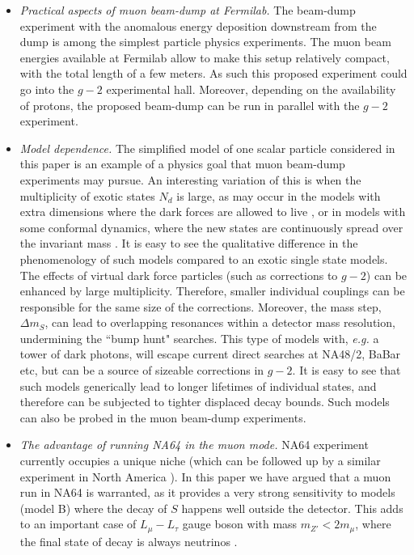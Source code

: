 \documentclass[prd,onecolumn,notitlepage,
nofootinbib,aps,tightenlines,
preprintnumbers,amsmath,amssymb,amsfonts,showpacs,superscriptaddress]{revtex4-1}
\begin{document}
\begin{itemize}

\item {\em Practical aspects of muon beam-dump at Fermilab.} The beam-dump experiment with the anomalous energy 
deposition downstream from the dump is among the simplest particle physics experiments. The muon beam energies
available at Fermilab allow to make this setup relatively compact, with the total length of a few meters. As such 
this proposed experiment could go into the $g-2$ experimental hall. Moreover, depending on the availability of protons, 
the proposed beam-dump can be run in parallel with the $g-2$ experiment. 

\item {\em Model dependence. } The simplified model of one scalar particle considered in this paper is an example of a 
physics goal that muon beam-dump experiments may pursue. An interesting variation of this is when the 
multiplicity of exotic states $N_d$ is large, as 
may occur in the models with extra dimensions where the dark forces 
are allowed to live \cite{McDonald:2010iq,Wallace:2013eya,Jaeckel:2014eba}, 
or in models with some conformal  dynamics, where the new states are continuously spread over the invariant mass \cite{Georgi:2007ek}. 
It is easy to see the qualitative difference in the phenomenology of such models compared to an exotic single state models. 
The effects of virtual dark force particles (such as corrections 
to $g-2$) can be enhanced by large multiplicity. 
Therefore, smaller individual couplings can be responsible for the same size of the corrections. Moreover, the 
mass step, $\Delta m_S$, can lead to overlapping resonances within a detector mass resolution, undermining the ``bump hunt" searches. 
This type of models with, {\em e.g.} a tower of dark photons,  will escape current direct searches at NA48/2, BaBar etc, but can be a source
of sizeable corrections in $g-2$. It is easy to see that such models generically lead to longer lifetimes of individual states, and therefore 
can be subjected to tighter displaced decay bounds. Such models can also be probed in the muon beam-dump experiments.


\item {\em The advantage of running NA64 in the muon mode. }  NA64 experiment currently occupies a 
unique niche (which can be followed up by a similar experiment in North America \cite{Izaguirre:2014bca}). In this paper we have argued
that a muon run in NA64 is warranted, as it provides a very strong sensitivity to models (model B) where the 
decay of $S$ happens well outside the detector. This adds to an important case of $L_\mu-L_\tau$ gauge boson 
with mass $m_{Z'} < 2 m_\mu$, where the final state of decay is always neutrinos  \cite{Gninenko:2014pea}. 


\end{itemize}
\end{document}
